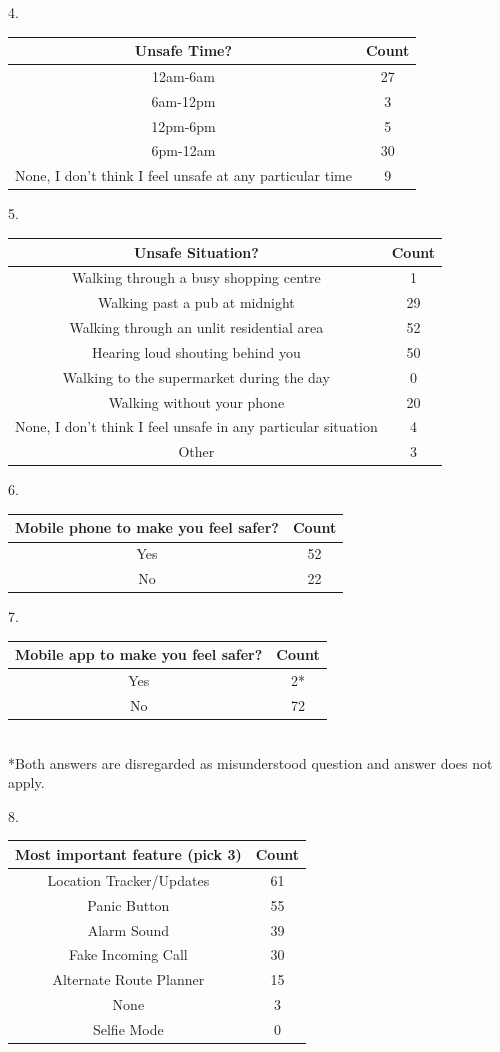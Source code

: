 \documentclass[a4paper]{report}
\begin{document}
4. \begin{tabular} {|c|c|}
	\hline
	Unsafe Time? & Count \\
	\hline
	 12am-6am & 27 \\
	 \hline 
	 6am-12pm & 3 \\
	 \hline
	 12pm-6pm & 5 \\
	 \hline
	 6pm-12am & 30 \\
	 \hline
	 None, I don't think I feel unsafe at any particular time & 9 \\
	\hline
\end{tabular}
\bigskip

5. \begin{tabular} {|c|c|}
	\hline
	Unsafe Situation? & Count \\
	\hline
	Walking through a busy shopping centre & 1 \\
	\hline
	Walking past a pub at midnight & 29 \\
	\hline
	Walking through an unlit residential area & 52 \\
	\hline 
	Hearing loud shouting behind you & 50\\
	\hline
	Walking to the supermarket during the day & 0 \\
	\hline
	Walking without your phone & 20 \\
	\hline
	None, I don't think I feel unsafe in any particular situation & 4 \\
	\hline
	Other & 3 \\
	\hline
\end{tabular}
\bigskip 

6. 
\begin{tabular} {|c|c|}
	\hline
	Mobile phone to make you feel safer? & Count \\
	\hline
	Yes & 52 \\
	\hline
	No & 22 \\
	\hline
\end{tabular}
\bigskip 

7. \begin{tabular} {|c|c|}
	\hline
	Mobile app to make you feel safer? & Count \\
	\hline
	Yes & 2* \\
	\hline
	No & 72 \\
	\hline
\end{tabular}\\
*Both answers are disregarded as misunderstood question and answer does not apply. 
\bigskip 

8. \begin{tabular}{|c|c|}
		\hline
		Most important feature (pick 3) & Count\\
		\hline
		Location Tracker/Updates & 61 \\
		\hline
		Panic Button & 55 \\
		\hline
		Alarm Sound & 39 \\
		\hline
		Fake Incoming Call & 30 \\ 
		\hline
		Alternate Route Planner & 15 \\
		\hline
		None & 3 \\
		\hline
		Selfie Mode & 0 \\
		\hline
	\end{tabular}
	\bigskip 
	
\end{document}
